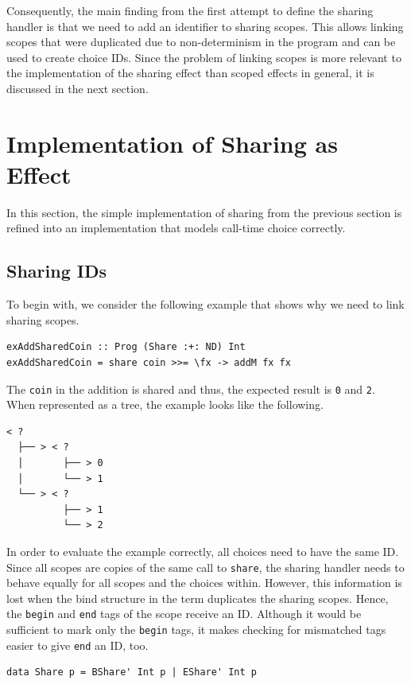 \documentclass[a4paper, 11pt, fleqn, twoside, abstract=on]{scrreprt}
\newcommand{\hinl}[1]{\texttt{#1}}
\begin{document}
Consequently, the main finding from the first attempt to define the sharing handler is that we need to add an identifier to sharing scopes.
This allows linking scopes that were duplicated due to non-determinism in the program and can be used to create choice IDs.
Since the problem of linking scopes is more relevant to the implementation of the sharing effect than scoped effects in general, it is discussed in the next section.

\section{Implementation of Sharing as Effect}
\label{subsec:sharingImplementation}
In this section, the simple implementation of sharing from the previous section is refined into an implementation that models call-time choice correctly.

\subsection{Sharing IDs}
To begin with, we consider the following example that shows why we need to link sharing scopes.

\begin{verbatim}
exAddSharedCoin :: Prog (Share :+: ND) Int
exAddSharedCoin = share coin >>= \fx -> addM fx fx
\end{verbatim}

The \hinl{coin} in the addition is shared and thus, the expected result is \hinl{0} and \hinl{2}.
When represented as a tree, the example looks like the following.

\begin{verbatim}
< ? 
  ├── > < ? 
  │       ├── > 0
  │       └── > 1
  └── > < ? 
          ├── > 1
          └── > 2
\end{verbatim}

In order to evaluate the example correctly, all choices need to have the same ID.
Since all scopes are copies of the same call to \hinl{share}, the sharing handler needs to behave equally for all scopes and the choices within.
However, this information is lost when the bind structure in the term duplicates the sharing scopes.
Hence, the \hinl{begin} and \hinl{end} tags of the scope receive an ID.
Although it would be sufficient to mark only the \hinl{begin} tags, it makes checking for mismatched tags easier to give \hinl{end} an ID, too.

\begin{verbatim}
data Share p = BShare' Int p | EShare' Int p
\end{verbatim}
\end{document}
